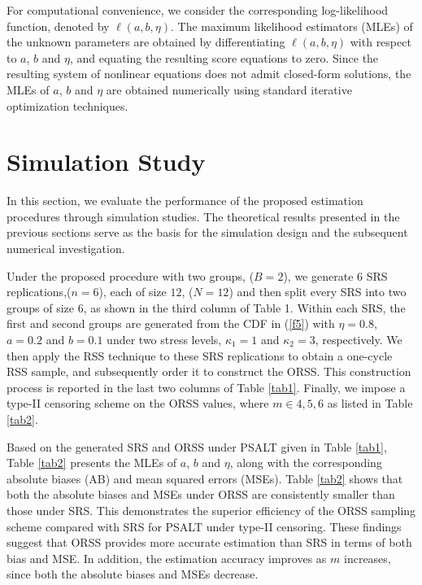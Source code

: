 \documentclass[twoside]{article}
\begin{document}
For computational convenience, we consider the corresponding log-likelihood function, denoted by $\ell(a,b,\eta)$. The maximum likelihood estimators (MLEs) of the unknown parameters are obtained by differentiating $\ell(a,b,\eta)$ with respect to $a$, $b$ and $\eta$, and equating the resulting score equations to zero. Since the resulting system of nonlinear equations does not admit closed-form solutions, the MLEs of $a$, $b$ and $\eta$ are obtained numerically using standard iterative optimization techniques. 









\section{Simulation Study}
In this section, we evaluate the performance of the proposed estimation procedures through simulation studies. The theoretical results presented in the previous sections serve as the basis for the simulation design and the subsequent numerical investigation.

Under the proposed procedure with two groups, ($B=2$), we generate $6$ SRS replications,($n=6$), each of size $12$, ($N=12$) and then split every SRS into two groups of size $6$, as shown in the third column of Table 1.  Within each SRS, the first and second groups are generated from the CDF in (\ref{f5}) with $\eta=0.8$, $a=0.2$ and $b=0.1$ under two stress levels, $\kappa_1=1$ and $\kappa_2=3$, respectively. We then apply the RSS technique to these SRS replications to obtain a one-cycle RSS sample, and subsequently order it to construct the ORSS. This construction process is reported in the last two columns of Table \ref{tab1}. Finally, we impose a type-II censoring scheme on the ORSS values, where $m \in {4,5,6}$ as listed in Table \ref{tab2}.

Based on the generated SRS and ORSS under PSALT given in Table \ref{tab1}, Table \ref{tab2} presents the MLEs of $a$, $b$ and $\eta$, along with the corresponding absolute biases (AB) and mean squared errors (MSEs). Table \ref{tab2} shows that both the absolute biases and MSEs under ORSS are consistently smaller than those under SRS. This demonstrates the superior efficiency of the ORSS sampling scheme compared with SRS for PSALT under type-II censoring. These findings suggest that ORSS provides more accurate estimation than SRS in terms of both bias and MSE. In addition, the estimation accuracy improves as $m$ increases, since both the absolute biases and MSEs decrease.
\end{document}
